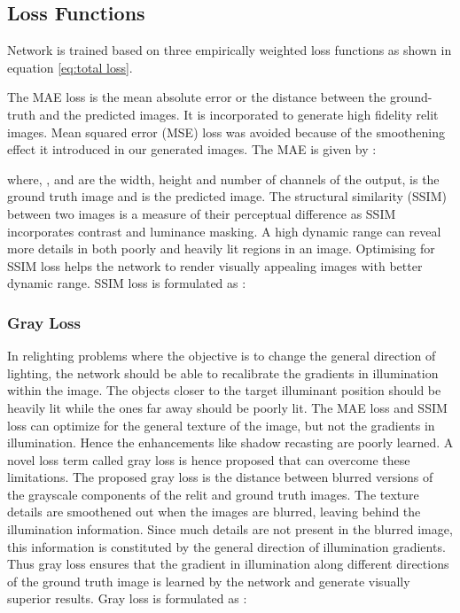 \documentclass[runningheads]{llncs}
\begin{document}
\subsection{Loss Functions}
\par
Network is trained based on three empirically weighted loss functions as shown in equation \ref{eq:total loss}.


The MAE loss is the mean absolute error or the  distance between the ground-truth and the predicted images. It is incorporated to generate high fidelity relit images. Mean squared error (MSE) loss was avoided because of the smoothening effect it introduced in our generated images. The MAE is given by :

where, ,  and  are the width, height and number of channels of the output,  is the ground truth image and  is the predicted image.
The structural similarity (SSIM) \cite{wang2004image}  between two images is a measure of their perceptual difference as SSIM incorporates contrast and luminance masking. A high dynamic range can reveal more details in both poorly and heavily lit regions in an image. Optimising for SSIM loss helps the network to render visually appealing images with better dynamic range. SSIM loss is formulated as :



\subsubsection{Gray Loss}
\par In relighting problems where the objective is to change the general direction of lighting, the network should be able to recalibrate the gradients in illumination within the image. The objects closer to the target illuminant position should be heavily lit while the ones far away should be poorly lit. The MAE loss and SSIM loss can optimize for the general texture of the image, but not the gradients in illumination. Hence the enhancements like shadow recasting are poorly learned. A novel loss term called gray loss is hence proposed that can overcome these limitations. The proposed gray loss is the  distance between blurred versions of the grayscale components of the relit and ground truth images. The texture details are smoothened out when the images are blurred, leaving behind the illumination information. Since much details are not present in the blurred image, this information is constituted by the general direction of illumination gradients. Thus gray loss ensures that the gradient in illumination along different directions of the ground truth image is learned by the network and generate visually superior results. Gray loss is formulated as :
\end{document}
